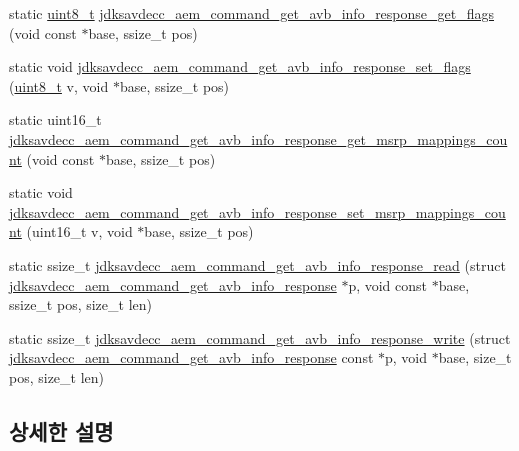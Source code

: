 \begin{DoxyCompactItemize}
\item 
static \hyperlink{stdint_8h_aba7bc1797add20fe3efdf37ced1182c5}{uint8\+\_\+t} \hyperlink{group__command__get__avb__info__response_ga3a2b82f574fce5b72cfad1976b7f5ea4}{jdksavdecc\+\_\+aem\+\_\+command\+\_\+get\+\_\+avb\+\_\+info\+\_\+response\+\_\+get\+\_\+flags} (void const $\ast$base, ssize\+\_\+t pos)
\item 
static void \hyperlink{group__command__get__avb__info__response_ga84deeb3ad5801426954ecd0f33ff02df}{jdksavdecc\+\_\+aem\+\_\+command\+\_\+get\+\_\+avb\+\_\+info\+\_\+response\+\_\+set\+\_\+flags} (\hyperlink{stdint_8h_aba7bc1797add20fe3efdf37ced1182c5}{uint8\+\_\+t} v, void $\ast$base, ssize\+\_\+t pos)
\item 
static uint16\+\_\+t \hyperlink{group__command__get__avb__info__response_ga1ba45632973be780373a4a51105508e9}{jdksavdecc\+\_\+aem\+\_\+command\+\_\+get\+\_\+avb\+\_\+info\+\_\+response\+\_\+get\+\_\+msrp\+\_\+mappings\+\_\+count} (void const $\ast$base, ssize\+\_\+t pos)
\item 
static void \hyperlink{group__command__get__avb__info__response_ga282262c910e555b7032231902e9deacf}{jdksavdecc\+\_\+aem\+\_\+command\+\_\+get\+\_\+avb\+\_\+info\+\_\+response\+\_\+set\+\_\+msrp\+\_\+mappings\+\_\+count} (uint16\+\_\+t v, void $\ast$base, ssize\+\_\+t pos)
\item 
static ssize\+\_\+t \hyperlink{group__command__get__avb__info__response_ga544ccf7b736eae83dcfd58ea1570667a}{jdksavdecc\+\_\+aem\+\_\+command\+\_\+get\+\_\+avb\+\_\+info\+\_\+response\+\_\+read} (struct \hyperlink{structjdksavdecc__aem__command__get__avb__info__response}{jdksavdecc\+\_\+aem\+\_\+command\+\_\+get\+\_\+avb\+\_\+info\+\_\+response} $\ast$p, void const $\ast$base, ssize\+\_\+t pos, size\+\_\+t len)
\item 
static ssize\+\_\+t \hyperlink{group__command__get__avb__info__response_gafc6f92f488c709adf3db3d02de405441}{jdksavdecc\+\_\+aem\+\_\+command\+\_\+get\+\_\+avb\+\_\+info\+\_\+response\+\_\+write} (struct \hyperlink{structjdksavdecc__aem__command__get__avb__info__response}{jdksavdecc\+\_\+aem\+\_\+command\+\_\+get\+\_\+avb\+\_\+info\+\_\+response} const $\ast$p, void $\ast$base, size\+\_\+t pos, size\+\_\+t len)
\end{DoxyCompactItemize}


\subsection{상세한 설명}


